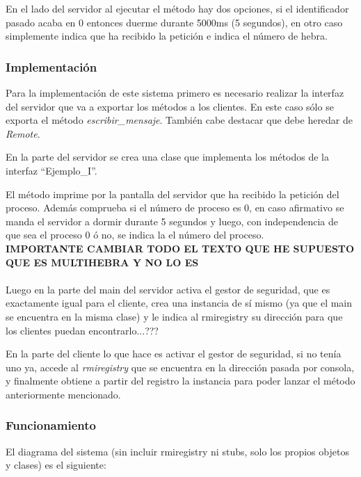 \documentclass{article}
\begin{document}
En el lado del servidor al ejecutar el método hay dos opciones, si el identificador pasado acaba en 0 entonces duerme durante 5000ms (5 segundos), en otro caso simplemente indica que ha recibido la petición e indica el número de hebra.



\subsubsection{Implementación}
Para la implementación de este sistema primero es necesario realizar la interfaz del servidor que va a exportar los métodos a los clientes. En este caso sólo se exporta el método \textit{escribir\_mensaje}. También cabe destacar que debe heredar de \textit{Remote}.

En la parte del servidor se crea una clase que implementa los métodos de la interfaz ``Ejemplo\_I''.

El método imprime por la pantalla del servidor que ha recibido la petición del proceso. Además comprueba si el número de proceso es 0, en caso afirmativo se manda el servidor a dormir durante 5 segundos y luego, con independencia de que sea el proceso 0 ó no, se indica la el número del proceso.
\\

\textbf{IMPORTANTE CAMBIAR TODO EL TEXTO QUE HE SUPUESTO QUE ES MULTIHEBRA Y NO LO ES}
\\\\
Luego en la parte del main del servidor activa el gestor de seguridad, que es exactamente igual para el cliente, crea una instancia de sí mismo (ya que el main se encuentra en la misma clase) y le indica al rmiregistry su dirección para que los clientes puedan encontrarlo...???

En la parte del cliente lo que hace es activar el gestor de seguridad, si no tenía uno ya, accede al \textit{rmiregistry} que se encuentra en la dirección pasada por consola, y finalmente obtiene a partir del registro la instancia para poder lanzar el método anteriormente mencionado.


\subsubsection{Funcionamiento}
El diagrama del sistema (sin incluir rmiregistry ni stubs, solo los propios objetos y clases) es el siguiente:
\end{document}
